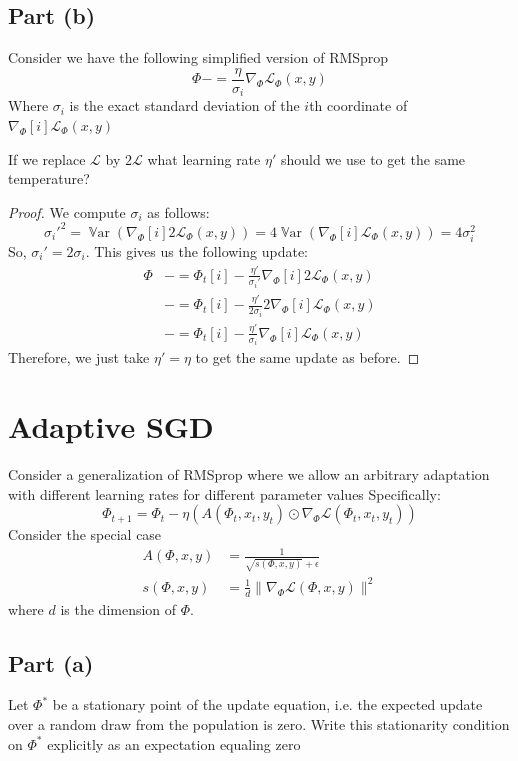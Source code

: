 \documentclass{amsart}
\newcommand{\cL}{\mathcal{L}}
\DeclareMathOperator{\Var}{\mathbb{V}ar}  %
\theoremstyle{definition}
\begin{document}
\subsection*{Part (b)} Consider we have the following simplified version of RMSprop 
\[
\Phi -= \frac{\eta}{\sigma_i} \nabla_\Phi \cL_\Phi(x, y)
\]
Where $\sigma_i$ is the exact standard deviation of the $i$th coordinate of $\nabla_\Phi[i] \cL_\Phi(x,y)$

If we replace $\cL$ by $2\cL$ what learning rate $\eta'$ should we use to get the same temperature?

\begin{proof}
    We compute $\sigma_i$ as follows:
    \[
    \sigma_i'^2 = \Var{(\nabla_\Phi[i] 2 \cL_\Phi(x, y))} = 4 \Var{(\nabla_\Phi[i] \cL_\Phi(x, y))} = 4 \sigma_i^2
    \]
    So, $\sigma_i' = 2 \sigma_i$. This gives us the following update:
    \begin{align*}
        \Phi &-= \Phi_t[i] - \frac{\eta'}{\sigma_i'} \nabla_\Phi[i] 2 \cL_\Phi(x, y)\\
        &-= \Phi_t[i] - \frac{\eta'}{2\sigma_i} 2 \nabla_\Phi[i] \cL_\Phi(x, y)\\
        &-= \Phi_t[i] - \frac{\eta'}{\sigma_i} \nabla_\Phi[i] \cL_\Phi(x, y)
    \end{align*}
    Therefore, we just take $\eta' = \eta$ to get the same update as before.
\end{proof}

\section*{Adaptive SGD} Consider a generalization of RMSprop where we allow an arbitrary adaptation with different learning rates for different parameter values
Specifically:
\[
\Phi_{t + 1} = \Phi_t - \eta (A(\Phi_t, x_t, y_t) \odot \nabla_\Phi \cL(\Phi_t, x_t, y_t))
\]
Consider the special case
\begin{align*}
    A(\Phi, x, y) &= \frac{1}{\sqrt{s(\Phi, x, y)} + \epsilon}\\
    s(\Phi, x, y) &= \frac1{d} \| \nabla_\Phi \cL(\Phi, x, y)\|^2
\end{align*}
where $d$ is the dimension of $\Phi$.

\subsection*{Part (a)}
Let $\Phi^\ast$ be a stationary point of the update equation, i.e. the expected update over a random draw from the population is zero.
Write this stationarity condition on $\Phi^\ast$ explicitly as an expectation equaling zero
\end{document}
